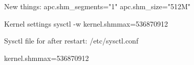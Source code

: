 New things:
apc.shm_segments="1"
apc.shm_size="512M"

Kernel settings
sysctl -w kernel.shmmax=536870912 

Sysctl file for after restart:
/etc/sysctl.conf

kernel.shmmax=536870912
